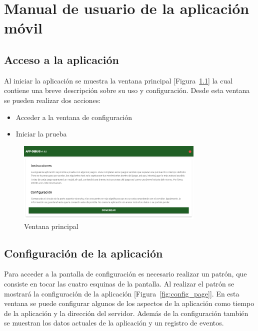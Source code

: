 \chapter{Manual de usuario de la aplicación móvil}
\label{chap:application}

\section{Acceso a la aplicación}

Al iniciar la aplicación se muestra la ventana principal [Figura~\ref{fig:main_page}] la cual contiene una breve descripción sobre su uso y configuración. Desde esta ventana se pueden realizar dos acciones:
\begin{itemize}
    \item Acceder a la ventana de configuración
    \item Iniciar la prueba
\end{itemize}

\begin{figure}[!h]
    \centering
    \includegraphics[width=0.8\textwidth, keepaspectratio]{imaxes/application/main_page.png}
    \caption{Ventana principal}
    \label{fig:main_page}
\end{figure}

\section{Configuración de la aplicación}

Para acceder a la pantalla de configuración es necesario realizar un patrón, que consiste en tocar las cuatro esquinas de la pantalla. Al realizar el patrón se mostrará la configuración de la aplicación [Figura~\ref{fig:config_page}]. En esta ventana se puede configurar algunos de los aspectos de la aplicación como tiempo de la aplicación y la dirección del servidor. Además de la configuración también se muestran los datos actuales de la aplicación y un registro de eventos.

